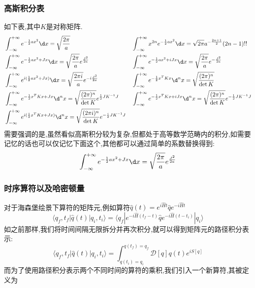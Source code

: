 \subsubsection{高斯积分表}
如下表,其中$ K $是对称矩阵.
\begin{equation}\label{GaussIntegral}
    \begin{aligned}
        &\int_{-\infty}^{+\infty} e^{-\frac{1}{2}ax^{2}}\dx=\sqrt{\frac{2\pi}{a}} 
        &&\int_{-\infty}^{+\infty}x^{2n}e^{-\frac12ax^2}\dx=\sqrt{2\pi}a^{-\frac{2n+1}2}(2n-1)!! \\
        &\int_{-\infty}^{+\infty}e^{-\frac12ax^2+Jx}\dx=\sqrt{\frac{2\pi}a}e^{\frac{J^2}{2a}} 
        &&\int_{-\infty}^{+\infty} e^{-\frac{1}{2} ax^{2}+iJx} \dx=\sqrt{\frac{2\pi}{a}}e^{-\frac{J^{2}}{2a}} \\
        &\int_{-\infty}^{+\infty}e^{i(\frac{1}{2}ax^{2}+Jx)}\dx=\sqrt{\frac{2\pi i}{a}}e^{-i\frac{J^{2}}{2a}} 
        &&\int_{-\infty}^{+\infty}e^{-\frac{1}{2}x^{T}Kx}\d^{n}x=\sqrt{\frac{(2\pi)^{n}}{\det K}} \\
        &\int_{-\infty}^{+\infty}e^{-\frac{1}{2}x^{T}Kx+Jx}\d^{n}x=\sqrt{\frac{(2\pi)^{n}}{\det K}}e^{\frac{1}{2}JK^{-1}J} 
        &&\int_{-\infty}^{+\infty}e^{-\frac{1}{2}x^{T}Kx+iJx}\d^{n}x=\sqrt{\frac{(2\pi)^{n}}{\det K}}e^{-\frac{1}{2}JK^{-1}J} \\
        &\int_{-\infty}^{+\infty}e^{i(\frac{1}{2}x^{T}Kx+Jx)}\d^{n}x=\sqrt{\frac{(2\pi i)^{n}}{\det K}}e^{-\frac{i}{2}JK^{-1}J}
    \end{aligned}
\end{equation}
需要强调的是,虽然看似高斯积分较为复杂,但都处于高等数学范畴内的积分,如需要记忆的话也可以仅记忆下面这个,其他都可以通过简单的系数替换得到:
\begin{equation}
    \int_{-\infty}^{+\infty}e^{-\frac12ax^2+Jx}\dx=\sqrt{\frac{2\pi}a}e^{\frac{J^2}{2a}}
\end{equation}
\subsubsection{时序算符以及哈密顿量}
对于海森堡绘景下算符的矩阵元,例如算符$\hat{q}(t)=e^{i\hat{H}t}\hat{q}e^{-i\hat{H}t}$
\begin{equation}
    \langle q_f,t_f|\hat{q}(t)|q_i,t_i\rangle=\langle q_f|e^{-i\hat{H}(t_f-t)}\hat{q}e^{-i\hat{H}(t-t_i)}|q_i\rangle 
\end{equation}
如之前那样,我们将时间间隔无限拆分并再次积分,就可以得到矩阵元的路径积分表示:
\begin{equation}
    \langle q_f,t_f|\hat{q}(t)|q_i,t_i\rangle=\int_{q(t_i)=q_i}^{q(t_f)=q_f}\mathcal{D}[q] q(t)e^{iS[q]}
\end{equation}
而为了使用路径积分表示两个不同时间的算符的乘积,我们引入一个新算符,其被定义为\\

